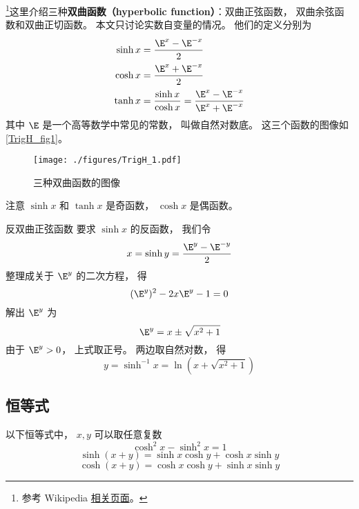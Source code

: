 

\footnote{参考 Wikipedia \href{https://en.wikipedia.org/wiki/Hyperbolic_functions}{相关页面}。}这里介绍三种\textbf{双曲函数（hyperbolic function）}：双曲正弦函数， 双曲余弦函数和双曲正切函数。 本文只讨论实数自变量的情况。 他们的定义分别为
\begin{align}
\sinh x &= \frac{\E^x - \E^{-x}}{2}\\
\label{TrigH_eq1}
\cosh x &= \frac{\E^x + \E^{-x}}{2}\\
\tanh x &= \frac{\sinh x}{\cosh x} = \frac{\E^x - \E^{-x}}{\E^x + \E^{-x}}
\end{align}
其中 $\E$ 是一个高等数学中常见的常数， 叫做自然对数底。 这三个函数的图像如\autoref{TrigH_fig1}。

\begin{figure}[ht]
\centering
\texttt{[image: ./figures/TrigH\_1.pdf]}
\caption{三种双曲函数的图像} \label{TrigH_fig1}
\end{figure}

注意 $\sinh x$ 和 $\tanh x$ 是奇函数， $\cosh x$ 是偶函数。

\begin{example}{反双曲正弦函数}\label{TrigH_ex1}
要求 $\sinh x$ 的反函数， 我们令
\begin{equation}
x = \sinh y =  \frac{\E^y - \E^{-y}}{2}
\end{equation}
整理成关于 $\E^y$ 的二次方程， 得
\begin{equation}
(\E^y)^2 - 2x \E^y - 1 = 0
\end{equation}
解出 $\E^y$ 为
\begin{equation}
\E^y = x \pm \sqrt{x^2 + 1}
\end{equation}
由于 $\E^y > 0$， 上式取正号。 两边取自然对数， 得
\begin{equation}
y = \sinh^{-1} x = \ln(x + \sqrt{x^2 + 1})
\end{equation}
\end{example}

\subsection{恒等式}
以下恒等式中， $x,y$ 可以取任意复数
\begin{equation}
\cosh^2 x - \sinh^2 x = 1
\end{equation}
\begin{equation}
\sinh(x+y) = \sinh x \cosh y + \cosh x \sinh y
\end{equation}
\begin{equation}
\cosh(x+y) = \cosh x \cosh y + \sinh x \sinh y
\end{equation}
